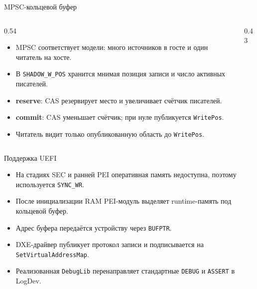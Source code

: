 \documentclass[aspectratio=169, 11pt]{beamer}
\begin{document}
\begin{frame}{MPSC-кольцевой буфер}
    \begin{columns}[T]
        \begin{column}{0.54\textwidth}
            \begin{itemize}
                \item MPSC соответствует модели: много источников в госте и один читатель на хосте.
                \item В \texttt{SHADOW\_W\_POS} хранится мнимая позиция записи и число активных писателей.
                \item \textbf{reserve}: CAS резервирует место и увеличивает счётчик писателей.
                \item \textbf{commit}: CAS уменьшает счётчик; при нуле публикуется \texttt{WritePos}.
                \item Читатель видит только опубликованную область до \texttt{WritePos}.
            \end{itemize}
        \end{column}
        \begin{column}{0.43\textwidth}
            \centering
        \end{column}
    \end{columns}
\end{frame}

\begin{frame}{Поддержка UEFI}
    \begin{itemize}
        \item На стадиях SEC и ранней PEI оперативная память недоступна, поэтому используется \texttt{SYNC\_WR}.
        \item После инициализации RAM PEI-модуль выделяет runtime-память под кольцевой буфер.
        \item Адрес буфера передаётся устройству через \texttt{BUFPTR}.
        \item DXE-драйвер публикует протокол записи и подписывается на \texttt{SetVirtualAddressMap}.
        \item Реализованная \texttt{DebugLib} перенаправляет стандартные \texttt{DEBUG} и \texttt{ASSERT} в LogDev.
    \end{itemize}
\end{frame}
\end{document}
